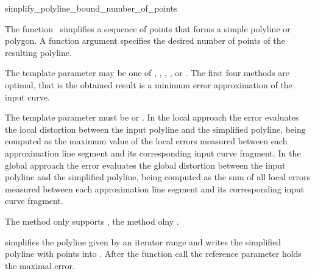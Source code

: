 

\begin{ccRefFunction}{simplify_polyline_bound_number_of_points}

\ccDefinition
  
The function \ccRefName\ simplifies a
sequence of points that forms a simple polyline or polygon. A
function argument specifies the desired number of
points of the resulting polyline.

The template parameter  may be one of
, ,
, , or
.  The first four methods are optimal, that is the
obtained result is a minimum error approximation of the input curve.

The template parameter  must be  or .
In the local approach the error evaluates the local
distortion between the input polyline and the simplified polyline,
being computed as the maximum value of the local errors measured
between each approximation line segment and its corresponding input
curve fragment.
In the global approach the error evaluates the
global distortion between the input polyline and the simplified
polyline, being computed as the sum of all local errors measured
between each approximation line segment and its corresponding input
curve fragment.

The  method only supports ,
the  method olny .


            {simplifies the polyline given by an iterator range and writes the simplified
             polyline with  points into . After the function call 
             the reference parameter  holds the maximal error.}




\end{ccRefFunction}
